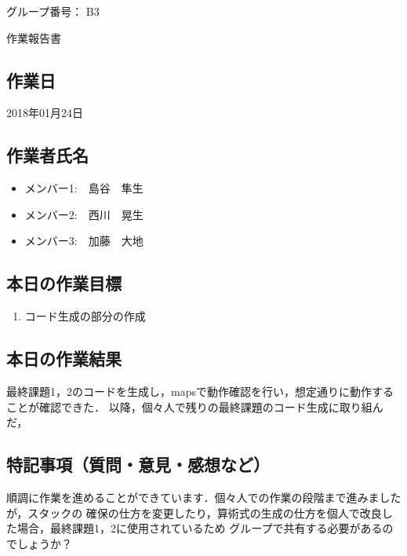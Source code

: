 \documentclass[a4j]{jarticle}
\begin{document}
\thispagestyle{empty}

\begin{flushright}
グループ番号： B3
\end{flushright}

\begin{center}
{\LARGE 作業報告書}
\end{center}

\subsection*{作業日}

2018年01月24日


\subsection*{作業者氏名}

\begin{itemize}
  \item メンバー1:　島谷　隼生
  \item メンバー2:　西川　晃生
  \item メンバー3:　加藤　大地
\end{itemize}

\subsection*{本日の作業目標}

\begin{enumerate}
\item
コード生成の部分の作成


\end{enumerate}

\subsection*{本日の作業結果}

最終課題1，2のコードを生成し，mapsで動作確認を行い，想定通りに動作することが確認できた．
以降，個々人で残りの最終課題のコード生成に取り組んだ，

\subsection*{特記事項（質問・意見・感想など）}

順調に作業を進めることができています．個々人での作業の段階まで進みましたが，スタックの
確保の仕方を変更したり，算術式の生成の仕方を個人で改良した場合，最終課題1，2に使用されているため
グループで共有する必要があるのでしょうか？
\end{document}
